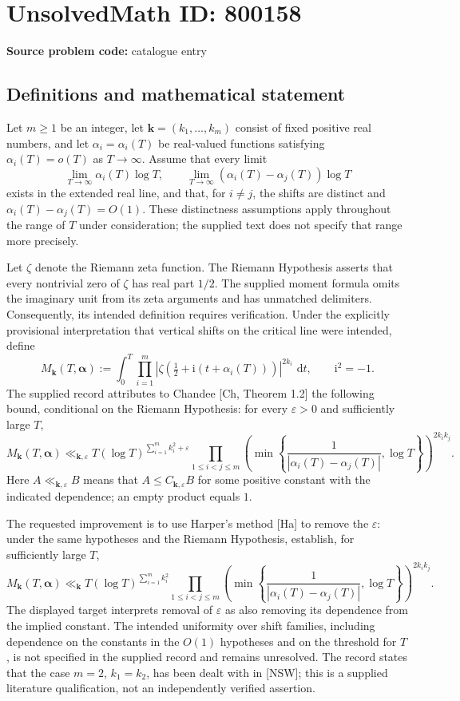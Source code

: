 \documentclass[11pt]{article}
\newcommand{\dd}{\,\mathrm{d}}
\begin{document}
\section*{UnsolvedMath ID: 800158}
\textbf{Source problem code:} catalogue entry
\subsection{Definitions and mathematical statement}
Let \(m\geq 1\) be an integer, let \(\mathbf{k}=(k_1,\ldots,k_m)\) consist of fixed positive real numbers, and let \(\alpha_i=\alpha_i(T)\) be real-valued functions satisfying \(\alpha_i(T)=o(T)\) as \(T\to\infty\). Assume that every limit
\[
\lim_{T\to\infty}\alpha_i(T)\log T,
\qquad
\lim_{T\to\infty}(\alpha_i(T)-\alpha_j(T))\log T
\]
exists in the extended real line, and that, for \(i\ne j\), the shifts are distinct and \(\alpha_i(T)-\alpha_j(T)=O(1)\). These distinctness assumptions apply throughout the range of \(T\) under consideration; the supplied text does not specify that range more precisely.

Let \(\zeta\) denote the Riemann zeta function. The Riemann Hypothesis asserts that every nontrivial zero of \(\zeta\) has real part \(1/2\). The supplied moment formula omits the imaginary unit from its zeta arguments and has unmatched delimiters. Consequently, its intended definition requires verification. Under the explicitly provisional interpretation that vertical shifts on the critical line were intended, define
\[
M_{\mathbf{k}}(T,\boldsymbol{\alpha})
:=\int_0^T\prod_{i=1}^m
\left|\zeta\!\left(\tfrac12+\mathrm{i}(t+\alpha_i(T))\right)\right|^{2k_i}\,\dd t,
\qquad \mathrm{i}^2=-1.
\]
The supplied record attributes to Chandee [Ch, Theorem 1.2] the following bound, conditional on the Riemann Hypothesis: for every \(\varepsilon>0\) and sufficiently large \(T\),
\[
M_{\mathbf{k}}(T,\boldsymbol{\alpha})
\ll_{\mathbf{k},\varepsilon}
T(\log T)^{\sum_{i=1}^m k_i^2+\varepsilon}
\prod_{1\leq i<j\leq m}
\left(\min\left\{\frac{1}{|\alpha_i(T)-\alpha_j(T)|},\log T\right\}\right)^{2k_i k_j}.
\]
Here \(A\ll_{\mathbf{k},\varepsilon}B\) means that \(A\leq C_{\mathbf{k},\varepsilon}B\) for some positive constant with the indicated dependence; an empty product equals \(1\).

The requested improvement is to use Harper's method [Ha] to remove the \(\varepsilon\): under the same hypotheses and the Riemann Hypothesis, establish, for sufficiently large \(T\),
\[
M_{\mathbf{k}}(T,\boldsymbol{\alpha})
\ll_{\mathbf{k}}
T(\log T)^{\sum_{i=1}^m k_i^2}
\prod_{1\leq i<j\leq m}
\left(\min\left\{\frac{1}{|\alpha_i(T)-\alpha_j(T)|},\log T\right\}\right)^{2k_i k_j}.
\]
The displayed target interprets removal of \(\varepsilon\) as also removing its dependence from the implied constant. The intended uniformity over shift families, including dependence on the constants in the \(O(1)\) hypotheses and on the threshold for \(T\), is not specified in the supplied record and remains unresolved. The record states that the case \(m=2\), \(k_1=k_2\), has been dealt with in [NSW]; this is a supplied literature qualification, not an independently verified assertion.
\end{document}
